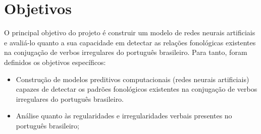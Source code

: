 
\section{Objetivos}
\label{sec:objectives}

O principal objetivo do projeto é construir um modelo de redes neurais artificiais e avaliá-lo quanto a sua capacidade em detectar as relações fonológicas existentes na conjugação de verbos irregulares do português brasileiro.
Para tanto, foram definidos os objetivos específicos:

\begin{itemize}
\item Construção de modelos preditivos computacionais (redes neurais artificiais) capazes de detectar os padrões fonológicos existentes na conjugação de verbos irregulares do português brasileiro.

\item Análise quanto às regularidades e irregularidades verbais presentes no português brasileiro;

\end{itemize}

